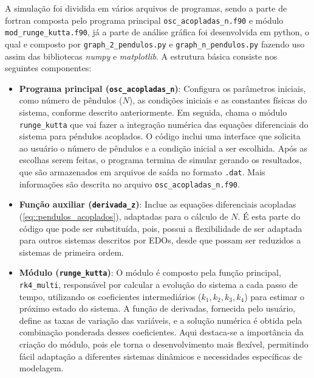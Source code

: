 \documentclass[a4paper, 11pt]{article}
\begin{document}
    A simulação foi dividida em vários arquivos de programas, sendo a parte de fortran composta pelo programa principal \texttt{osc\_acopladas\_n.f90} e módulo \texttt{mod\_runge\_kutta.f90}, já a parte de análise gráfica foi desenvolvida em python, o qual e composto por \texttt{graph\_2\_pendulos.py} e \texttt{graph\_n\_pendulos.py} fazendo uso assim das bibliotecas \textit{numpy} e \textit{matplotlib}. A estrutura básica consiste nos seguintes componentes:

\begin{itemize}

    \item \textbf{Programa principal (\texttt{osc\_acopladas\_n})}: Configura os parâmetros iniciais, como número de pêndulos ($N$), as condições iniciais e as constantes físicas do sistema, conforme descrito anteriormente. Em seguida, chama o módulo \texttt{runge\_kutta} que vai fazer a integração numérica das equações diferenciais do sistema para péndulos acoplados. O código inclui uma interface que solicita ao usuário o número de pêndulos e a condição inicial a ser escolhida. Após as escolhas serem feitas, o programa termina de simular gerando os resultados, que são armazenados em arquivos de saída no formato \texttt{.dat}. Mais informações são descrita no arquivo \texttt{osc\_acopladas\_n.f90}.

    \item \textbf{Função auxiliar (\texttt{derivada\_z})}: Inclue as equações diferenciais acopladas (\ref{eq::pendulos_acoplados}), adaptadas para o cálculo de  $N$. É esta parte do código que pode ser substituída, pois, possui a flexibilidade de ser adaptada para outros sistemas descritos por EDOs, desde que possam ser reduzidos a sistemas de primeira ordem.

    \item \textbf{Módulo (\texttt{runge\_kutta})}: O módulo é composto pela função principal, \texttt{rk4\_multi}, responsável por calcular a evolução do sistema a cada passo de tempo, utilizando os coeficientes intermediários (\(k_1, k_2, k_3, k_4\)) para estimar o próximo estado do sistema. A função de derivadas, fornecida pelo usuário, define as taxas de variação das variáveis, e a solução numérica é obtida pela combinação ponderada desses coeficientes. Aqui destaca-se a importância da criação do módulo, pois ele torna o desenvolvimento mais flexível, permitindo fácil adaptação a diferentes sistemas dinâmicos e necessidades específicas de modelagem.
\end{itemize}
\end{document}

